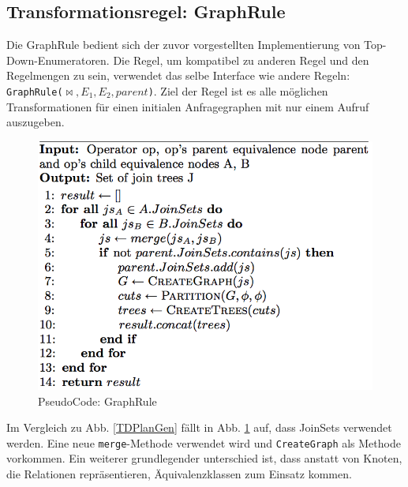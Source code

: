 \subsection{Transformationsregel: GraphRule}

Die GraphRule bedient sich der zuvor vorgestellten Implementierung von Top-Down-Enumeratoren. Die Regel, um kompatibel zu anderen Regel und den Regelmengen zu sein, verwendet das selbe Interface wie andere Regeln: \texttt{GraphRule($\Join, E_1, E_2, parent$)}.  Ziel der Regel ist es alle möglichen Transformationen für einen initialen Anfragegraphen mit nur einem Aufruf auszugeben. 

\begin{figure}[ht]
  \centering
  \includegraphics[scale=0.4]{03_Regeln/00_media/GraphRule.png}
  \caption{PseudoCode: GraphRule}
  \label{GraphRule}
\end{figure}

Im Vergleich zu Abb. \ref{TDPlanGen} fällt in Abb. \ref{GraphRule} auf, dass JoinSets verwendet werden. Eine neue \texttt{merge}-Methode verwendet wird und \texttt{CreateGraph} als Methode vorkommen. Ein weiterer grundlegender unterschied ist, dass anstatt von Knoten, die Relationen repräsentieren, Äquivalenzklassen zum Einsatz kommen.





